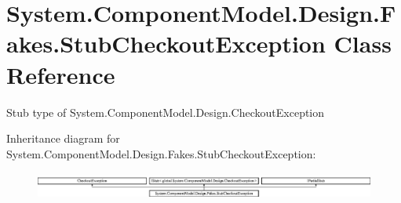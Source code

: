 \hypertarget{class_system_1_1_component_model_1_1_design_1_1_fakes_1_1_stub_checkout_exception}{\section{System.\-Component\-Model.\-Design.\-Fakes.\-Stub\-Checkout\-Exception Class Reference}
\label{class_system_1_1_component_model_1_1_design_1_1_fakes_1_1_stub_checkout_exception}
}


Stub type of System.\-Component\-Model.\-Design.\-Checkout\-Exception 


Inheritance diagram for System.\-Component\-Model.\-Design.\-Fakes.\-Stub\-Checkout\-Exception\-:\begin{figure}[H]
\begin{center}
\leavevmode
\includegraphics[height=0.917281cm]{class_system_1_1_component_model_1_1_design_1_1_fakes_1_1_stub_checkout_exception}
\end{center}
\end{figure}
